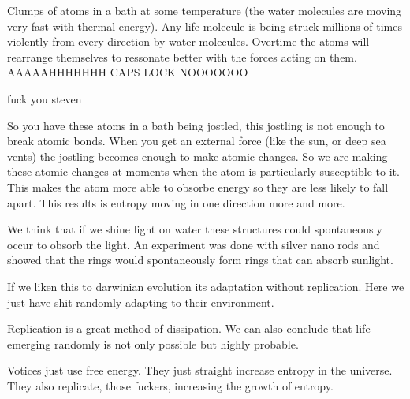 \documentclass{article}
\begin{document}

Clumps of atoms in a bath at some temperature (the water molecules are moving very fast with thermal energy). Any life molecule is being struck millions of times violently from every direction by water molecules. Overtime the atoms will rearrange themselves to ressonate better with the forces acting on them. AAAAAHHHHHHH CAPS LOCK NOOOOOOO

fuck you steven


So you have these atoms in a bath being jostled, this jostling is not enough to break atomic bonds. When you get an external force (like the sun, or deep sea vents) the jostling becomes enough to make atomic changes. So we are making these atomic changes at moments when the atom is particularly susceptible to it. This makes the atom more able to obsorbe energy so they are less likely to fall apart. This results is entropy moving in one direction more and more.


We think that if we shine light on water these structures could spontaneously occur to obsorb the light. An experiment was done with silver nano rods and showed that the rings would spontaneously form rings that can absorb sunlight.


If we liken this to darwinian evolution its adaptation without replication. Here we just have shit randomly adapting to their environment.


Replication is a great method of dissipation. We can also conclude that life emerging randomly is not only possible but highly probable.


Votices just use free energy. They just straight increase entropy in the universe. They also replicate, those fuckers, increasing the growth of entropy.


\end{document}
